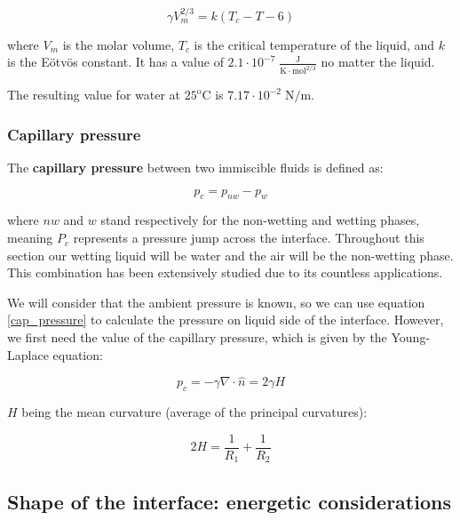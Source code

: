 \begin{equation} 
\gamma V_m^{2/3}=k\left(T_{c}-T-6\right)
\label{eotvos}
\end{equation}

where $V_m$ is the molar volume, $T_c$ is the critical temperature of the liquid, and $k$ is the Eötvös constant. It has a value of $2.1\cdot 10^{-7} \; \frac{\textrm{J}}{\textrm{K} \cdot \textrm{mol}^{\textrm{2/3}}}$ no matter the liquid.

The resulting value for water at $25^\textrm{o} \textrm{C}$ is $7.17 \cdot 10^{-2} \; \textrm{N/m}$.

\subsubsection{Capillary pressure}

The \textbf{capillary pressure} between two immiscible fluids is defined as:

\begin{equation} 
	p_c = p_{nw} - p_{w}
	\label{cap_pressure}
\end{equation}

where $nw$ and $w$ stand respectively for the non-wetting and wetting phases, meaning $P_c$ represents a pressure jump across the interface. Throughout this section our wetting liquid will be water and the air will be the non-wetting phase. This combination has been extensively studied due to its countless applications.

We will consider that the ambient pressure is known, so we can use equation \ref{cap_pressure} to calculate the pressure on liquid side of the interface. However, we first need the value of the capillary pressure, which is given by the Young-Laplace equation:

\begin{equation} 
p_c = -\gamma \nabla \cdot \hat{n} = 2 \gamma H
\label{young_laplace}
\end{equation}

$H$ being the mean curvature (average of the principal curvatures):

\begin{equation} 
2H = \frac{1}{R_1} + \frac{1}{R_2}
\label{curvature}
\end{equation}

\subsection{Shape of the interface: energetic considerations}


